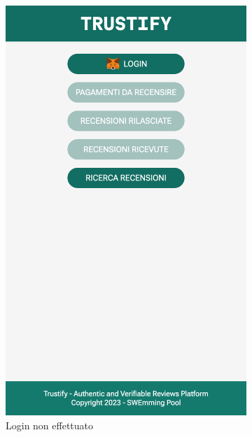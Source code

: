 \begin{figure}[t]
    \centering
    \begin{subfigure}{0.4\textwidth}
    \centering
    \includegraphics[width=0.9\linewidth]{src/img/home.png}
    \caption{Login non effettuato}\label{fig:home_nologin}
    \end{subfigure}
    \begin{subfigure}{0.4\textwidth}
    \centering

\end{subfigure}
\end{figure}
